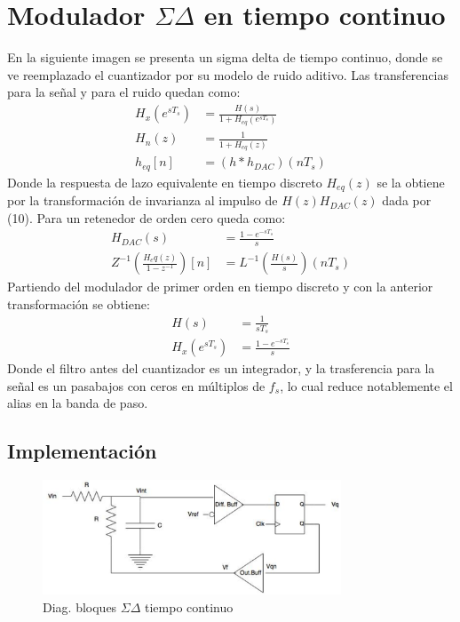 \documentclass[a4paper,conference]{IEEEtran}
\begin{document}
\section{Modulador $\Sigma\Delta$ en tiempo continuo}
En la siguiente imagen se presenta un sigma delta de tiempo continuo, donde se ve reemplazado el cuantizador por su modelo de ruido aditivo.
Las transferencias para la se\~nal y para el ruido quedan como:
\begin{align}
H_x(e^{sT_s}) &= \frac{H(s)}{1+H_{eq}(e^{sT_s})} \\
H_n(z) &= \frac{1}{1+H_{eq}(z)} \\
h_{eq}[n] &= (h\ast h_{DAC})(nT_s)
\end{align}
Donde la respuesta de lazo equivalente en tiempo discreto $H_{eq}(z)$ se la obtiene por la transformaci\'on de invarianza al impulso \cite{DSP:Pro-Man} de $H(z)H_{DAC}(z)$ dada por (10). Para un retenedor de orden cero queda como:
\begin{align}
 H_{DAC}(s)&=\frac{1-e^{-sT_s}}{s}\\
 Z^{-1}(\frac{H_eq(z)}{1-z^{-1}})[n]&=L^{-1}(\frac{H(s)}{s})(nT_s)
\end{align}
Partiendo del modulador de primer orden en tiempo discreto y con la anterior transformaci\'on se obtiene:
\begin{align}
 H(s)&=\frac{1}{sT_s}\\
 H_x(e^{sT_s})&= \frac{1-e^{-sT_s}}{s}
\end{align}
Donde el filtro antes del cuantizador es un integrador, y la trasferencia para la se\~nal es un pasabajos con ceros en múltiplos de $f_s$, lo cual reduce notablemente el alias en la banda de paso.
\subsection{Implementaci\'on}

\begin{figure}[!t]
\centering
\includegraphics[width=3.5in]{Sigma-Delta_Tiempo_Continuo}
\caption{Diag. bloques $\Sigma\Delta$ tiempo continuo}
\label{fig_4}
\end{figure}
\end{document}
